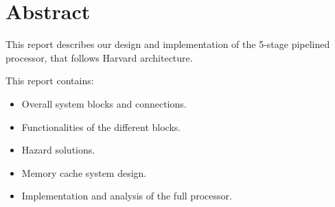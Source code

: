 \section{Abstract}
This report describes our design and implementation of the 5-stage pipelined processor, that follows Harvard architecture.

This report contains:
\begin{itemize}
    \item Overall system blocks and connections.
    \item Functionalities of the different blocks.
    \item Hazard solutions.
    \item Memory cache system design.
    \item Implementation and analysis of the full processor.
\end{itemize}
